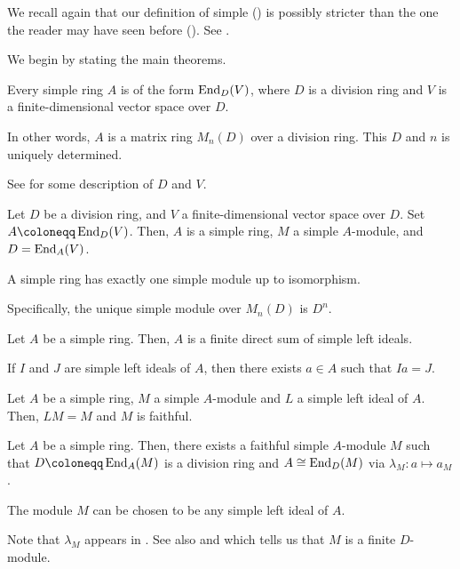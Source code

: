 \documentclass[12pt]{article}
\begin{document}
We recall again that our definition of simple () is possibly stricter than the one the reader may have seen before (). See .

We begin by stating the main theorems.

\begin{thm} \label{thm:simple-ring-is-matrix-ring}
	Every simple ring $A$ is of the form $\operatorname{End}_{D}(V)$, 
	where $D$ is a division ring and $V$ is a finite-dimensional vector space over $D$. 

	In other words, $A$ is a matrix ring $M_{n}(D)$ over a division ring. 
	This $D$ and $n$ is uniquely determined.
\end{thm}
See  for some description of $D$ and $V$.

\begin{thm}
	Let $D$ be a division ring, and $V$ a finite-dimensional vector space over $D$. Set $A \coloneqq \End_{D}(V)$. Then, $A$ is a simple ring, $M$ a simple $A$-module, and $D = \operatorname{End}_{A}(V)$.
\end{thm}

\begin{thm}
	A simple ring has exactly one simple module up to isomorphism.

	Specifically, the unique simple module over $M_{n}(D)$ is $D^{n}$.
\end{thm}

\begin{thm}
	Let $A$ be a simple ring. Then, $A$ is a finite direct sum of simple left ideals.

	If $I$ and $J$ are simple left ideals of $A$, then there exists $a \in A$ such that $Ia = J$.
\end{thm}

\begin{thm}
	Let $A$ be a simple ring, $M$ a simple $A$-module and $L$ a simple left ideal of $A$. 
	Then, $LM = M$ and $M$ is faithful.
\end{thm}

\begin{thm} \label{thm:simple-ring-commutant-isomorphism}
	Let $A$ be a simple ring. Then, there exists a faithful simple $A$-module $M$ such that $D \coloneqq \End_{A}(M)$ is a division ring and $A \cong \operatorname{End}_{D}(M)$ via $\lambda_{M} \colon a \mapsto a_{M}$. 

	The module $M$ can be chosen to be any simple left ideal of $A$. 
\end{thm}
Note that $\lambda_{M}$ appears in . 
See also  and  which tells us that $M$ is a finite $D$-module.
\end{document}
